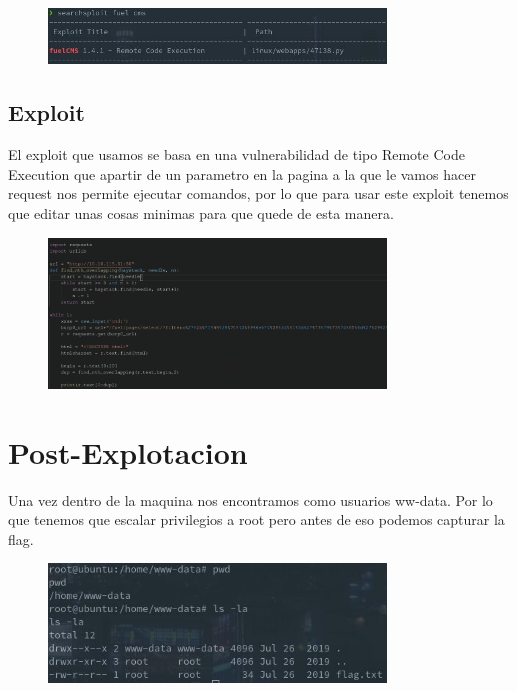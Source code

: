 \documentclass[a4paper]{article}%
\begin{document}
	\begin{figure}[h]
   \includegraphics[width=0.8\textwidth]{images/searchsploit.jpg}
   \end{figure}

	\subsection{Exploit}
	El exploit que usamos se basa en una vulnerabilidad de tipo Remote
	Code Execution que apartir de un parametro en la pagina a la que 
	le vamos hacer request nos permite ejecutar comandos, por lo que 
	para usar este exploit tenemos que editar unas cosas minimas para que quede de esta manera.

	\begin{figure}[h]
	\includegraphics[width=0.8\textwidth]{images/exploit.jpg}
	\end{figure}

	\newpage
	
	\section{Post-Explotacion}
	Una vez dentro de la maquina nos encontramos como usuarios ww-data.
	Por lo que tenemos que escalar privilegios a root pero antes de eso
	podemos capturar la flag.
	 
	\begin{figure}[h]
   \includegraphics[width=0.8\textwidth]{images/user.jpg}
   \end{figure}
\end{document}
